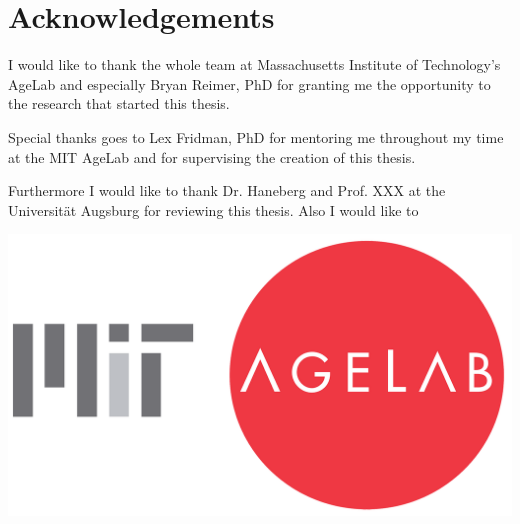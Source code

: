 \chapter*{Acknowledgements}
\label{acknowledgements}


I would like to thank the whole team at Massachusetts Institute of Technology's AgeLab and especially Bryan Reimer, PhD for granting me the opportunity to the research that started this thesis.

Special thanks goes to Lex Fridman, PhD for mentoring me throughout my time at the MIT AgeLab and for supervising the creation of this thesis. %


Furthermore I would like to thank Dr. Haneberg and Prof. XXX at the Universität Augsburg for reviewing this thesis. Also I would like to 


\vspace{1.5cm}
\begin{center}
	\includegraphics[width=.6\textwidth]{./images/logos/agelab}
\end{center}
